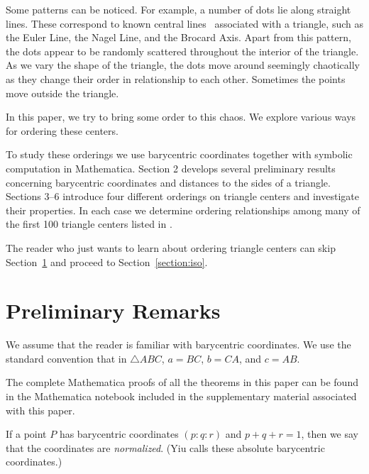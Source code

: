 \documentclass[12pt,a4paper]{amsart}
\begin{document}
Some patterns can be noticed. For example, a number of dots lie along
straight lines. These correspond to known central lines~\cite{CentralLines} associated with a triangle,
such as the Euler Line, the Nagel Line, and the Brocard Axis.
Apart from this pattern, the dots appear to be randomly scattered throughout the interior of the triangle.
As we vary the shape of the triangle, the dots move around seemingly chaotically as they change their order
in relationship to each other. Sometimes the points move outside the triangle.


In this paper, we try to bring some order to this chaos.
We explore various ways for ordering these centers.

To study these orderings we use barycentric coordinates together with symbolic computation in Mathematica. Section 2 develops several preliminary results concerning barycentric coordinates and distances to the sides of a triangle. Sections 3--6 introduce four different orderings on triangle centers and investigate their properties. In each case we determine ordering relationships among many of the first 100 triangle centers listed in \cite{ETC}.

The reader who just wants to learn about ordering triangle centers
can skip Section~\ref{section:prelim} and proceed to Section~\ref{section:iso}.


%

\section{Preliminary Remarks}
\label{section:prelim}


We assume that the reader is familiar with barycentric coordinates.
We use the standard convention that in $\triangle ABC$, $a=BC$, $b=CA$, and $c=AB$.

The complete Mathematica proofs of all the theorems in this paper can be
found in the Mathematica notebook included in the supplementary material
associated with this paper.


If a point $P$ has barycentric coordinates $(p:q:r)$ and $p+q+r=1$,
then we say that the coordinates are \emph{normalized}. 
(Yiu \cite[\S 3.1.2]{Yiu} calls these absolute barycentric coordinates.)
\end{document}
